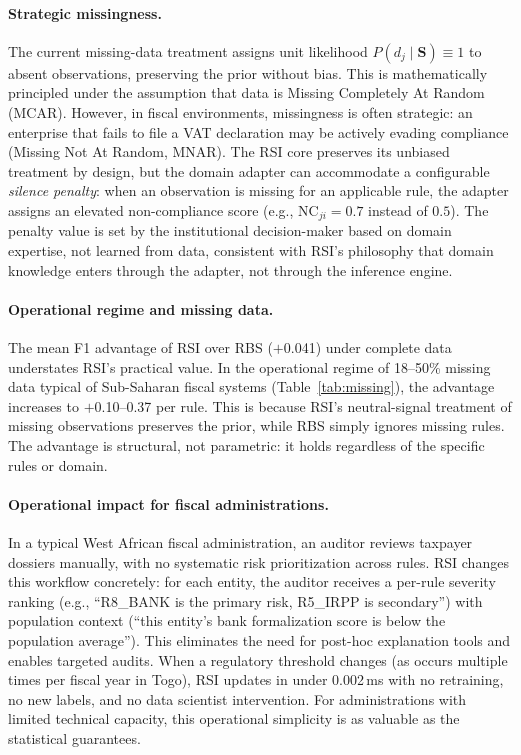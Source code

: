 \documentclass[letterpaper]{article}
\begin{document}
\paragraph{Strategic missingness.}
The current missing-data treatment assigns unit likelihood
$P(d_j \mid \mathbf{S}) \equiv 1$ to absent observations, preserving
the prior without bias. This is mathematically principled under the
assumption that data is Missing Completely At Random (MCAR). However,
in fiscal environments, missingness is often strategic: an enterprise
that fails to file a VAT declaration may be actively evading
compliance (Missing Not At Random, MNAR). The RSI core preserves
its unbiased treatment by design, but the domain adapter can
accommodate a configurable \emph{silence penalty}: when an observation
is missing for an applicable rule, the adapter assigns an elevated
non-compliance score (e.g., $\mathrm{NC}_{ji} = 0.7$ instead of
$0.5$). The penalty value is set by the institutional decision-maker
based on domain expertise, not learned from data, consistent with
RSI's philosophy that domain knowledge enters through the adapter,
not through the inference engine.

\paragraph{Operational regime and missing data.}
The mean F1 advantage of RSI over RBS ($+$0.041) under complete data
understates RSI's practical value. In the operational regime of
18--50\% missing data typical of Sub-Saharan fiscal systems
(Table~\ref{tab:missing}), the advantage increases to $+$0.10--0.37
per rule. This is because RSI's neutral-signal treatment of missing
observations preserves the prior, while RBS simply ignores missing
rules. The advantage is structural, not parametric: it holds regardless
of the specific rules or domain.

\paragraph{Operational impact for fiscal administrations.}
In a typical West African fiscal administration, an auditor reviews
taxpayer dossiers manually, with no systematic risk prioritization
across rules. RSI changes this workflow concretely: for each entity,
the auditor receives a per-rule severity ranking (e.g., ``R8\_BANK is
the primary risk, R5\_IRPP is secondary'') with population context
(``this entity's bank formalization score is below the population
average''). This eliminates the need for post-hoc explanation tools and
enables targeted audits. When a regulatory threshold changes (as occurs
multiple times per fiscal year in Togo), RSI updates in under
0.002\,ms with no retraining, no new labels, and no data scientist
intervention. For administrations with limited technical capacity, this
operational simplicity is as valuable as the statistical guarantees.
\end{document}
